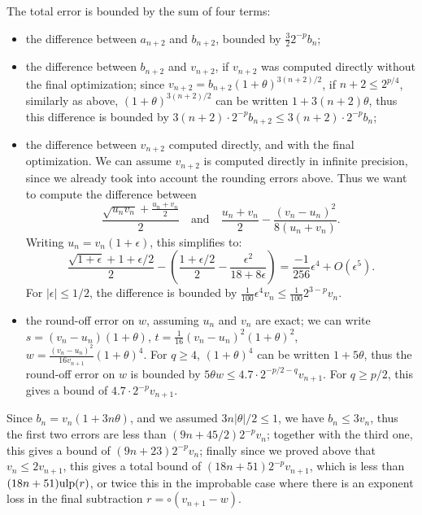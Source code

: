 \documentclass[12pt]{amsart}
\def\ulp{{\rm ulp}}
\begin{document}
The total error is bounded by the sum of four terms:
\begin{itemize}
\item the difference between $a_{n+2}$ and $b_{n+2}$, bounded by
      $\frac{3}{2} 2^{-p} b_n$;
\item the difference between $b_{n+2}$ and $v_{n+2}$, if $v_{n+2}$
      was computed directly without the final optimization;
      since $v_{n+2} = b_{n+2} (1+\theta)^{3(n+2)/2}$,
      if $n+2 \leq 2^{p/4}$, similarly as above, $(1+\theta)^{3(n+2)/2}$
      can be written $1 + 3(n+2)\theta$, thus this difference is bounded
      by $3(n+2) \cdot 2^{-p} b_{n+2} \leq 3(n+2) \cdot 2^{-p} b_n$;
\item the difference between $v_{n+2}$ computed directly, and with
      the final optimization. We can assume $v_{n+2}$ is computed
      directly in infinite precision, since we already took into account
      the rounding errors above. Thus we want to compute the difference
      between
\[ \frac{\sqrt{u_n v_n} + \frac{u_n+v_n}{2}}{2} \quad \mbox{and} \quad
  \frac{u_n+v_n}{2} - \frac{(v_n-u_n)^2}{8 (u_n+v_n)}. \]
      Writing $u_n = v_n (1+\epsilon)$, this simplifies to:
\[ \frac{\sqrt{1+\epsilon} + 1 + \epsilon/2}{2} - \left(
      \frac{1+\epsilon/2}{2} - \frac{\epsilon^2}{18 + 8 \epsilon}\right)
      = \frac{-1}{256} \epsilon^4 + O(\epsilon^5). \]
      For $|\epsilon| \leq 1/2$, the difference is bounded by $\frac{1}{100}
      \epsilon^4 v_n \leq \frac{1}{100} 2^{3-p} v_n$.
\item the round-off error on $w$, assuming $u_n$ and $v_n$ are exact;
      we can write $s = (v_n - u_n) (1+\theta)$, $t = \frac{1}{16}
      (v_n - u_n)^2 (1+\theta)^2$, $w = \frac{(v_n - u_n)^2}{16v_{n+1}}
      (1+\theta)^4$. For $q \geq 4$, $(1+\theta)^4$ can be written
      $1+5\theta$, thus the round-off error on $w$ is bounded by
      $5 \theta w \leq 4.7 \cdot 2^{-p/2-q} v_{n+1}$. For $q \geq p/2$,
      this gives a bound of $4.7 \cdot 2^{-p} v_{n+1}$.
\end{itemize}
Since $b_n = v_n (1+3n \theta)$, and we assumed $3n|\theta|/2 \leq 1$,
we have $b_n \leq 3v_n$, thus
the first two errors are less than $(9n+45/2) 2^{-p} v_n$;
together with the third one, this gives a bound of $(9n + 23) 2^{-p} v_n$;
finally since we proved above that $v_n \leq 2v_{n+1}$,
this gives a total bound of $(18n+51) 2^{-p} v_{n+1}$, which is less
than $(18n+51) \ulp(r)$, or twice this in the improbable case where there
is an exponent loss in the final subtraction $r = \circ(v_{n+1}-w)$.
\end{document}
